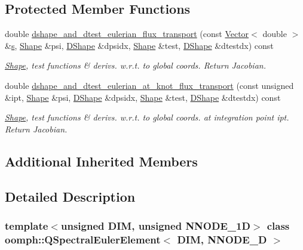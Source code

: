 \subsection*{Protected Member Functions}
\begin{DoxyCompactItemize}
\item 
double \hyperlink{classoomph_1_1QSpectralEulerElement_a1dc148b0c455243d79387ee6399a29df}{dshape\+\_\+and\+\_\+dtest\+\_\+eulerian\+\_\+flux\+\_\+transport} (const \hyperlink{classoomph_1_1Vector}{Vector}$<$ double $>$ \&\hyperlink{cfortran_8h_ab7123126e4885ef647dd9c6e3807a21c}{s}, \hyperlink{classoomph_1_1Shape}{Shape} \&psi, \hyperlink{classoomph_1_1DShape}{D\+Shape} \&dpsidx, \hyperlink{classoomph_1_1Shape}{Shape} \&test, \hyperlink{classoomph_1_1DShape}{D\+Shape} \&dtestdx) const
\begin{DoxyCompactList}\small\item\em \hyperlink{classoomph_1_1Shape}{Shape}, test functions \& derivs. w.\+r.\+t. to global coords. Return Jacobian. \end{DoxyCompactList}\item 
double \hyperlink{classoomph_1_1QSpectralEulerElement_a1aea03c046d9d1bec4717182386d7860}{dshape\+\_\+and\+\_\+dtest\+\_\+eulerian\+\_\+at\+\_\+knot\+\_\+flux\+\_\+transport} (const unsigned \&ipt, \hyperlink{classoomph_1_1Shape}{Shape} \&psi, \hyperlink{classoomph_1_1DShape}{D\+Shape} \&dpsidx, \hyperlink{classoomph_1_1Shape}{Shape} \&test, \hyperlink{classoomph_1_1DShape}{D\+Shape} \&dtestdx) const
\begin{DoxyCompactList}\small\item\em \hyperlink{classoomph_1_1Shape}{Shape}, test functions \& derivs. w.\+r.\+t. to global coords. at integration point ipt. Return Jacobian. \end{DoxyCompactList}\end{DoxyCompactItemize}
\subsection*{Additional Inherited Members}


\subsection{Detailed Description}
\subsubsection*{template$<$unsigned D\+IM, unsigned N\+N\+O\+D\+E\+\_\+1D$>$\newline
class oomph\+::\+Q\+Spectral\+Euler\+Element$<$ D\+I\+M, N\+N\+O\+D\+E\+\_\+D $>$}



